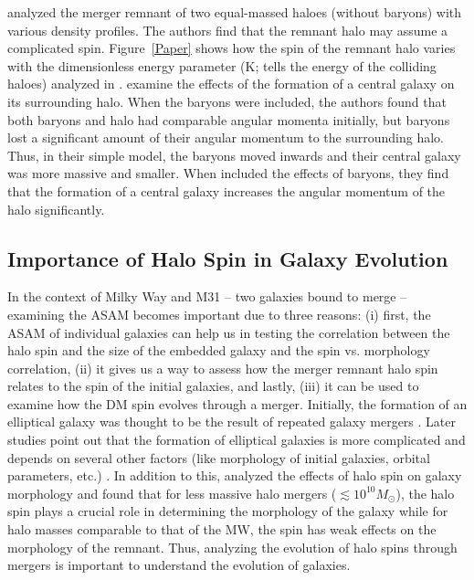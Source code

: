 \documentclass[twocolumn]{aastex631}
\begin{document}
\citet{2019MNRAS.487..993D} analyzed the merger remnant of two equal-massed haloes (without baryons) with various density profiles. The authors find that the remnant halo may assume a complicated spin. Figure~\ref{Paper} shows how the spin of the remnant halo varies with the dimensionless energy parameter (K; tells the energy of the colliding haloes) analyzed in \citet{2019MNRAS.487..993D}. \citet{2010MNRAS.407..435A} examine the effects of the formation of a central galaxy on its surrounding halo. When the baryons were included, the authors found that both baryons and halo had comparable angular momenta initially, but baryons lost a significant amount of their angular momentum to the surrounding halo. Thus, in their simple model, the baryons moved inwards and their central galaxy was more massive and smaller. When \citet{2010MNRAS.404.1137B} included the effects of baryons, they find that the formation of a central galaxy increases the angular momentum of the halo significantly. 

\subsection{Importance of Halo Spin in Galaxy Evolution}

In the context of Milky Way and M31 -- two galaxies bound to merge --  examining the ASAM becomes important due to three reasons: (i) first, the ASAM of individual galaxies can help us in testing the correlation between the halo spin and the size of the embedded galaxy \citep[see e.g.,][]{2019MNRAS.488.4801J} and the spin vs. morphology correlation, (ii) it gives us a way to assess how the merger remnant halo spin relates to the spin of the initial galaxies, and lastly, (iii) it can be used to examine how the DM spin evolves through a merger. Initially, the formation of an elliptical galaxy was thought to be the result of repeated galaxy mergers \citep{tinsley1977evolution}. Later studies point out that the formation of elliptical galaxies is more complicated and depends on several other factors (like morphology of initial galaxies, orbital parameters, etc.) \citep[see e.g.,][]{1992ApJ...393..484B}. In addition to this, \citet{2017MNRAS.467.3083R} analyzed the effects of halo spin on galaxy morphology and found that for less massive halo mergers ($ 	\lesssim 10^{10} M_{\odot}$), the halo spin plays a crucial role in determining the morphology of the galaxy while for halo masses comparable to that of the MW, the spin has weak effects on the morphology of the remnant. Thus, analyzing the evolution of halo spins through mergers is important to understand the evolution of galaxies. 
\end{document}
